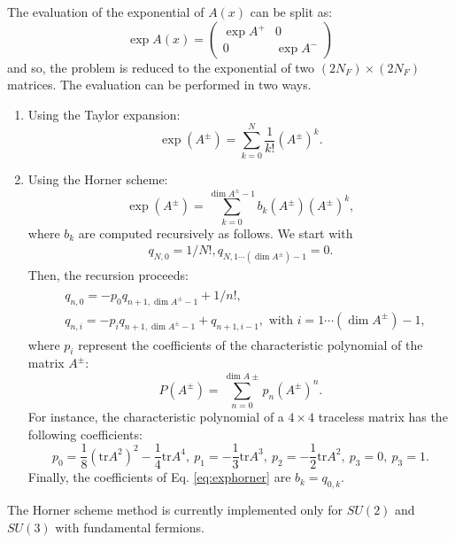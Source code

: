 \documentclass[12pt]{article}
\newcommand{\tr}{\mathrm{tr}}
\begin{document}
The evaluation of the exponential of $A(x)$ can be split as:
\begin{equation}
\exp A(x)  = \begin{pmatrix}
\exp A^+ & 0 \\
0& \exp A^-
\end{pmatrix}
\end{equation}
and so, the problem is reduced to the exponential of two $(2 N_F) \times  (2 N_F)$ matrices. The evaluation can be performed in two ways.
\begin{enumerate}
\item Using the Taylor expansion:
\begin{equation}
\exp(A^\pm) = \sum_{k=0}^N  \frac{1}{k!} (A^\pm)^k.
\end{equation}
\item Using the Horner scheme:
\begin{equation}
\exp(A^\pm) = \sum_{k=0}^{\dim A^\pm -1} b_k(A^\pm)  (A^\pm)^k, \label{eq:exphorner}
\end{equation}
where $b_k$ are computed recursively as follows. We start with
\begin{align}
q_{N,0} = 1/N!, q_{N,1 \cdots (\dim A^\pm)-1} = 0.
\end{align}
Then, the recursion proceeds:
\begin{align}
\begin{split}
&q_{n,0} = - p_0 q_{n+1, \dim A^\pm-1}  + 1/n!, \\  &q_{n,i} = - p_i q_{n+1, \dim A^\pm-1}  + q_{n+1,i-1}, \text{ with } i=1 \cdots (\dim A^\pm) -1 , \label{eq:horner}
\end{split}
\end{align}
where $p_i$ represent the coefficients of the characteristic  polynomial of the matrix $A^\pm$:
\begin{equation}
P(A^\pm) = \sum_{n=0}^{\dim A\pm} p_n (A^\pm)^n.
\end{equation}
For instance, the characteristic polynomial of a $4 \times 4$ traceless matrix has the following coefficients:
\begin{equation}
p_0=\frac{1}{8 } \left(\tr A^2\right)^2 - \frac{1}{4} \tr A^4 ,\ p_1 = -\frac{1}{3}\tr  A^3, \ p_2= -\frac{1}{2}\tr  A^2, \ p_3=0, \ p_3=1.
\end{equation}
Finally, the coefficients of Eq. \ref{eq:exphorner} are $b_k  =q_{0,k} $.
\end{enumerate}
The Horner scheme method is currently implemented only for $SU(2)$ and $SU(3)$ with fundamental fermions.
\end{document}
